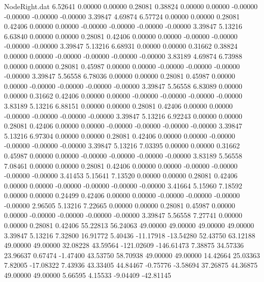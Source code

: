 \begin{filecontents}{NodeRight.dat}
   6.52641    0.00000    0.00000     0.28081    0.38824    0.00000    0.00000   -0.00000   -0.00000   -0.00000   -0.00000    3.39847    4.69874
   6.57724    0.00000    0.00000     0.28081    0.42406    0.00000    0.00000   -0.00000   -0.00000   -0.00000   -0.00000    3.39847    5.13216
   6.63840    0.00000    0.00000     0.28081    0.42406    0.00000    0.00000   -0.00000   -0.00000   -0.00000   -0.00000    3.39847    5.13216
   6.68931    0.00000    0.00000     0.31662    0.38824    0.00000    0.00000   -0.00000   -0.00000   -0.00000   -0.00000    3.83189    4.69874
   6.73988    0.00000    0.00000     0.28081    0.45987    0.00000    0.00000   -0.00000   -0.00000   -0.00000   -0.00000    3.39847    5.56558
   6.78036    0.00000    0.00000     0.28081    0.45987    0.00000    0.00000   -0.00000   -0.00000   -0.00000   -0.00000    3.39847    5.56558
   6.83089    0.00000    0.00000     0.31662    0.42406    0.00000    0.00000   -0.00000   -0.00000   -0.00000   -0.00000    3.83189    5.13216
   6.88151    0.00000    0.00000     0.28081    0.42406    0.00000    0.00000   -0.00000   -0.00000   -0.00000   -0.00000    3.39847    5.13216
   6.92243    0.00000    0.00000     0.28081    0.42406    0.00000    0.00000   -0.00000   -0.00000   -0.00000   -0.00000    3.39847    5.13216
   6.97304    0.00000    0.00000     0.28081    0.42406    0.00000    0.00000   -0.00000   -0.00000   -0.00000   -0.00000    3.39847    5.13216
   7.03395    0.00000    0.00000     0.31662    0.45987    0.00000    0.00000   -0.00000   -0.00000   -0.00000   -0.00000    3.83189    5.56558
   7.08461    0.00000    0.00000     0.28081    0.42406    0.00000    0.00000   -0.00000   -0.00000   -0.00000   -0.00000    3.41453    5.15641
   7.13520    0.00000    0.00000     0.28081    0.42406    0.00000    0.00000   -0.00000   -0.00000   -0.00000   -0.00000    3.41664    5.15960
   7.18592    0.00000    0.00000     0.24499    0.42406    0.00000    0.00000   -0.00000   -0.00000   -0.00000   -0.00000    2.96505    5.13216
   7.22665    0.00000    0.00000     0.28081    0.45987    0.00000    0.00000   -0.00000   -0.00000   -0.00000   -0.00000    3.39847    5.56558
   7.27741    0.00000    0.00000     0.28081    0.42406   55.22813   56.24063   49.00000   49.00000   49.00000   49.00000    3.39847    5.13216
   7.32800   16.91772    5.40436   -11.17918  -13.54280   52.43750   63.12188   49.00000   49.00000   32.08228   43.59564 -121.02609 -146.61473
   7.38875   34.57336   23.96637     0.67474   -1.47400   43.53750   58.70938   49.00000   49.00000   14.42664   25.03363    7.82005  -17.08322
   7.43936   43.33405   44.84467    -0.75776   -3.58694   37.26875   44.36875   49.00000   49.00000    5.66595    4.15533   -9.04409  -42.81145

\end{filecontents}
